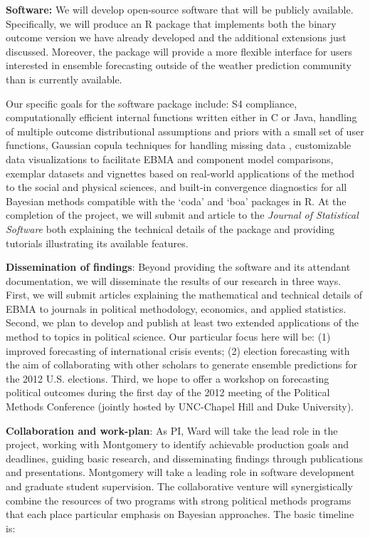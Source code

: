 \documentclass[pdftex,12pt,fullpage,oneside]{amsart}
\begin{document}
\textbf{Software:} We will develop open-source software that will be
publicly available.  Specifically, we will produce an R package that
implements both the binary outcome version we have already developed
and the additional extensions just discussed.  Moreover, the package
will provide a more flexible interface for users interested in
ensemble forecasting outside of the weather prediction community than
is currently available.  

Our specific goals for the software package include: S4 compliance,
computationally efficient internal functions written either in C or
Java, handling of multiple outcome distributional assumptions and
priors with a small set of user functions, Gaussian copula techniques
for handling missing data \citep{Hoff:2007}, customizable data
visualizations to facilitate EBMA and component model comparisons,
exemplar datasets and vignettes based on real-world applications of
the method to the social and physical sciences, and built-in
convergence diagnostics for all Bayesian methods compatible with the
`coda' and `boa' packages in R.  At the completion of the project, we
will submit and article to the \textit{Journal of Statistical
  Software} both explaining the technical details of the package and
providing tutorials illustrating its available features.

\textbf{Dissemination of findings}: Beyond providing the software and
its attendant documentation, we will disseminate the results of our
research in three ways.  First, we will submit articles explaining the
mathematical and technical details of EBMA to journals in political
methodology, economics, and applied statistics.  Second, we plan to
develop and publish at least two extended applications of the method
to topics in political science.  Our particular focus here will be:
(1) improved forecasting of international crisis events; (2) election
forecasting with the aim of collaborating with other scholars to
generate ensemble predictions for the 2012 U.S. elections.  Third, we
hope to offer a workshop on forecasting political outcomes during the
first day of the 2012 meeting of the Political Methods Conference
(jointly hosted by UNC-Chapel Hill and Duke University).

\textbf{Collaboration and work-plan}: As PI, Ward will take the lead
role in the project, working with Montgomery to identify achievable
production goals and deadlines, guiding basic research, and
disseminating findings through publications and presentations.
Montgomery will take a leading role in software development and
graduate student supervision. The collaborative venture
will synergistically combine the resources of two programs with strong
political methods programs that each place particular emphasis on Bayesian
approaches.  The basic timeline is:
\end{document}
